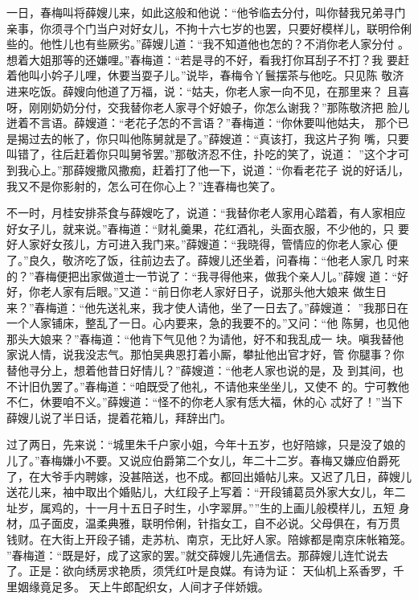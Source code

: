 一日，春梅叫将薛嫂儿来，如此这般和他说：“他爷临去分付，叫你替我兄弟寻门
亲事，你须寻个门当户对好女儿，不拘十六七岁的也罢，只要好模样儿，联明伶俐
些的。他性儿也有些厥劣。”薛嫂儿道：“我不知道他也怎的？不消你老人家分付
。想着大姐那等的还嫌哩。”春梅道：“若是寻的不好，看我打你耳刮子不打？我
要赶着他叫小妗子儿哩，休要当耍子儿。”说毕，春梅令丫鬟摆茶与他吃。只见陈
敬济进来吃饭。薛嫂向他道了万福，说：“姑夫，你老人家一向不见，在那里来？
且喜呀，刚刚奶奶分付，交我替你老人家寻个好娘子，你怎么谢我？”那陈敬济把
脸儿迸着不言语。薛嫂道：“老花子怎的不言语？”春梅道：“你休要叫他姑夫，
那个已是揭过去的帐了，你只叫他陈舅就是了。”薛嫂道：“真该打，我这片子狗
嘴，只要叫错了，往后赶着你只叫舅爷罢。”那敬济忍不住，扑吃的笑了，说道：
”这个才可到我心上。”那薛嫂撒风撒痴，赶着打了他一下，说道：“你看老花子
说的好话儿，我又不是你影射的，怎么可在你心上？”连春梅也笑了。

不一时，月桂安排茶食与薛嫂吃了，说道：“我替你老人家用心踏着，有人家相应
好女子儿，就来说。”春梅道：“财礼羹果，花红酒礼，头面衣服，不少他的，只
要好人家好女孩儿，方可进入我门来。”薛嫂道：“我晓得，管情应的你老人家心
便了。”良久，敬济吃了饭，往前边去了。薛嫂儿还坐着，问春梅：“他老人家几
时来的？”春梅便把出家做道士一节说了：“我寻得他来，做我个亲人儿。”薛嫂
道：“好好，你老人家有后眼。”又道：“前日你老人家好日子，说那头他大娘来
做生日来？”春梅道：“他先送礼来，我才使人请他，坐了一日去了。”薛嫂道：
”我那日在一个人家铺床，整乱了一日。心内要来，急的我要不的。”又问：“他
陈舅，也见他那头大娘来？”春梅道：“他肯下气见他？为请他，好不和我乱成一
块。嗔我替他家说人情，说我没志气。那怕吴典恩打着小厮，攀扯他出官才好，管
你腿事？你替他寻分上，想着他昔日好情儿？”薛嫂道：“他老人家也说的是，及
到其间，也不计旧仇罢了。”春梅道：“咱既受了他礼，不请他来坐坐儿，又使不
的。宁可教他不仁，休要咱不义。”薛嫂道：“怪不的你老人家有恁大福，休的心
忒好了！”当下薛嫂儿说了半日话，提着花箱儿，拜辞出门。

过了两日，先来说：“城里朱千户家小姐，今年十五岁，也好陪嫁，只是没了娘的
儿了。”春梅嫌小不要。又说应伯爵第二个女儿，年二十二岁。春梅又嫌应伯爵死
了，在大爷手内聘嫁，没甚陪送，也不成。都回出婚帖儿来。又迟了几日，薛嫂儿
送花儿来，袖中取出个婚贴儿，大红段子上写着：“开段铺葛员外家大女儿，年二
址岁，属鸡的，十一月十五日子时生，小字翠屏。””生的上画儿般模样儿，五短
身材，瓜子面皮，温柔典雅，联明伶俐，针指女工，自不必说。父母俱在，有万贯
钱财。在大街上开段子铺，走苏杭、南京，无比好人家。陪嫁都是南京床帐箱笼。
”春梅道：“既是好，成了这家的罢。”就交薛嫂儿先通信去。那薛嫂儿连忙说去
了。正是：欲向绣房求艳质，须凭红叶是良媒。有诗为证：
天仙机上系香罗，千里姻缘竟足多。
天上牛郎配织女，人间才子伴娇娥。

